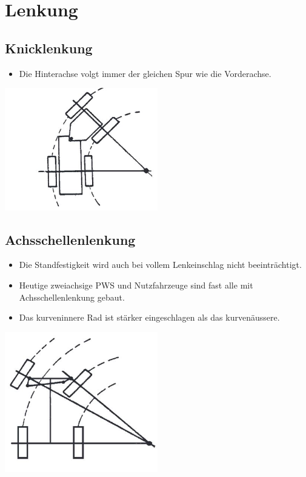 \section{Lenkung}
\subsection{Knicklenkung}
\begin{itemize}
\item Die Hinterachse volgt immer der gleichen Spur wie die Vorderachse.\\
\end{itemize}
\includegraphics[width=0.5\textwidth]{Images/Knicklenkung.JPG}
\subsection{Achsschellenlenkung}
\begin{itemize}	
\item Die Standfestigkeit wird auch bei vollem Lenkeinschlag nicht beeinträchtigt.\\
\item Heutige zweiachsige PWS und Nutzfahrzeuge sind fast alle mit Achsschellenlenkung gebaut.\\
\item Das kurveninnere Rad ist stärker eingeschlagen als das kurvenäussere.\\
\end{itemize}
\includegraphics[width=0.5\textwidth]{Images/Achsschellenlenkung.JPG}
